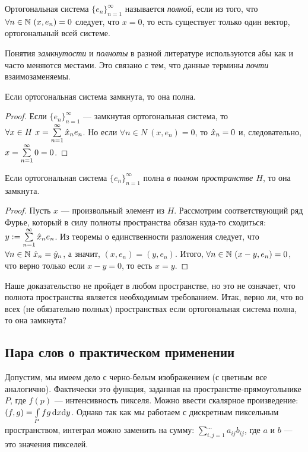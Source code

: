\begin{Def}
Ортогональная система $\{e_n\}_{n=1}^{\infty}$ называется \textit{полной}, если из того, что $\forall n \in \mathbb{N} \ (x, e_n) = 0$ следует, что $x = 0$, то есть существует только один вектор, ортогональный всей системе.
\end{Def}

Понятия \textit{замкнутости} и \textit{полноты} в разной литературе используются абы как и часто меняются местами. Это связано с тем, что данные термины \textit{почти} взаимозаменяемы.

\begin{Statement}
Если ортогональная система замкнута, то она полна.
\end{Statement}
\begin{proof}
Если $\{e_n\}_{n=1}^{\infty}$ --- замкнутая ортогональная система, то $\forall x \in H\ x = \sum\limits_{n=1}^{\infty}\hat{x}_ne_n$. Но если $\forall n \in N\ (x, e_n) = 0$, то $\hat{x}_n = 0$ и, следовательно, $x = \sum\limits_{n=1}^{\infty} 0 = 0$. 
\end{proof}

\begin{Statement}
Если ортогональная система $\{e_n\}_{n=1}^{\infty}$ полна \textit{в полном пространстве $H$}, то она замкнута.
\end{Statement}
\begin{proof}
Пусть $x$ --- произвольный элемент из $H$. Рассмотрим соответствующий ряд Фурье, который в силу полноты пространства обязан куда-то сходиться: $y := \sum\limits_{n=1}^{\infty} \hat{x}_ne_n$. Из теоремы о единственности разложения следует, что $\forall n \in \mathbb{N}\ \hat{x}_n = \hat{y}_n$, а значит, $(x, e_n) = (y, e_n)$. Итого, $\forall n \in \mathbb{N} \ (x - y, e_n) = 0$, что верно только если $x - y = 0$, то есть $x = y$.
\end{proof}
\begin{Task}
Наше доказательство не пройдет в любом пространстве, но это не означает, что полнота пространства является необходимым требованием. Итак, верно ли, что во всех (не обязательно полных) пространствах если ортогональная система полна, то она замкнута?
\end{Task}

\subsection{Пара слов о практическом применении}
Допустим, мы имеем дело с черно-белым изображением (с цветным все аналогично). Фактически это функция, заданная на пространстве-прямоугольнике $P$, где $f(p)$ --- интенсивность пикселя. Можно ввести скалярное произведение: $(f, g) = \int\limits_P fg \,\mathrm{d} x\mathrm{d} y$. Однако так как мы работаем с дискретным пиксельным пространством, интеграл можно заменить на сумму: $\sum\limits_{i, j = 1}^{\dots}a_{ij}b_{ij}$, где $a$ и $b$ --- это значения пикселей.

